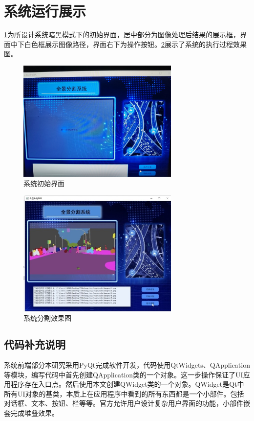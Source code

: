\section{系统运行展示}
\cref*{fig:f4c}为所设计系统暗黑模式下的初始界面，居中部分为图像处理后结果的展示框，界面中下白色框展示图像路径，界面右下为操作按钮。\cref*{fig:f4d}展示了系统的执行过程效果图。
\begin{figure}[htb]
    \centering
    \includegraphics[width=8cm]{fig/chap4/可视化2.jpg}
    \caption{系统初始界面}
    \label{fig:f4c}
\end{figure}


\begin{figure}[htb]
    \centering
    \includegraphics[width=8cm]{fig/chap4/可视化1.jpg}
    \caption{系统分割效果图}
    \label{fig:f4d}
\end{figure}
\subsection*{代码补充说明}
系统前端部分本研究采用PyQt完成软件开发，代码使用QtWidgets、QApplication等模块，编写代码中首先创建QApplication类的一个对象。这一步操作保证了UI应用程序存在入口点。然后使用本文创建QWidget类的一个对象。QWidget是Qt中所有UI对象的基类，本质上在应用程序中看到的所有东西都是一个小部件。包括对话框、文本、按钮、栏等等。官方允许用户设计复杂用户界面的功能，小部件嵌套完成堆叠效果。

